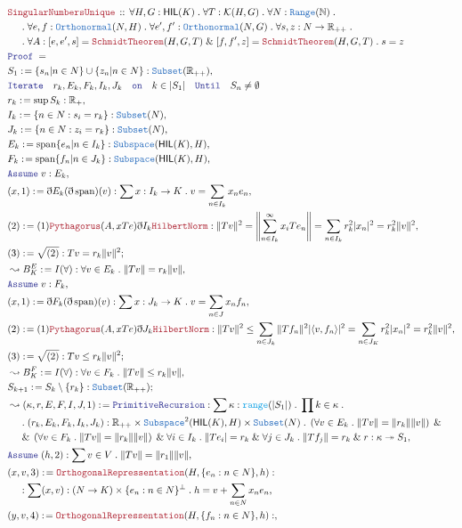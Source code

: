\documentclass[12pt]{scrartcl}
\newcommand{\TYPE}[1]{\textcolor{NavyBlue}{\mathtt{#1}}}
\newcommand{\FUNC}[1]{\textcolor{Cerulean}{\mathtt{#1}}}
\newcommand{\LOGIC}[1]{\textcolor{Blue}{\mathtt{#1}}}
\newcommand{\THM}[1]{\textcolor{Maroon}{\mathtt{#1}}}
\renewcommand{\.}{\; . \;}
\newcommand{\de}{: \kern 0.1pc =}
\newcommand{\Theorem}[2]{& \THM{#1} \, :: \, #2 \\ & \Proof = \\ }
\newcommand{\NewLine}{\\ & \kern 1pc}
\newcommand{\Page}[1]{\begin{align*} #1 \end{align*} \newpage   }
\newcommand{ \bd }{ \ByDef }
\renewcommand{\And}{\; \& \;}
\newcommand{\Reals}{\mathbb{R} }
\newcommand{\Nat}{\mathbb{N} }
\newcommand{\ToSurj}{\twoheadrightarrow}
\newcommand{\Say}[3]{& #1 \de #2 : #3, \\}
\newcommand{\Conclude}[3]{& #1 \de #2 : #3; \\}
\newcommand{\Derive}[3]{& \leadsto #1 \de #2 : #3, \\}
\newcommand{\A}{\LOGIC{Assume} \;}
\newcommand{\Assume}[2]{& \A #1 : #2, \\}
\newcommand{\ByDef}{\eth}
\newcommand{\Proof}{\LOGIC{Proof} \; }
\DeclareMathOperator{\Span}{span}
\newcommand{\HIL}{\mathsf{HIL}} %
\newcommand{\K}{\mathcal{K}} %
\begin{document}
\Page{
	\Theorem{SingularNumbersUnique}{\forall H,G : \HIL(K) \. \forall T : \K(H,G) \. \forall N : \TYPE{Range}(\Nat) \.
    \NewLine \.
    \forall e,f : \TYPE{Orthonormal}(N,H) \. \forall e',f' : \TYPE{Orthonormal}(N,G) \. \forall s,z : N \to \Reals_{++} \.
    \NewLine \.
    \forall A : [e,e',s] = \THM{SchmidtTheorem}(H,G,T)  \And [f,f',z] = \THM{SchmidtTheorem}(H,G,T) \. s = z
  }
  \Say{S_1}{ \{ s_n | n \in N \} \cup \{z_n | n \in N\} }{\TYPE{Subset}(\Reals_{++})}
  & \LOGIC{Iterate} \quad r_k, E_k,F_k,I_k,J_k \quad \LOGIC{on}  \quad k \in |S_1| \quad \LOGIC{Until}\quad S_n \neq \emptyset \\
  \Say{r_k}{\sup S_k}{\Reals_+}
  \Say{I_k}{ \{ n \in N : s_i = r_k  \}}{\TYPE{Subset}(N)}
  \Say{J_k}{\{ n \in N : z_i = r_k \}}{\TYPE{Subset}(N)}
  \Say{E_k}{ \Span \{ e_n | n \in I_k \}}{ \TYPE{Subspace}(\HIL(K),H)}
  \Say{F_k}{\Span \{ f_n | n \in J_k\}}{\TYPE{Subspace}(\HIL(K),H)}
  \Assume{v}{E_k}
  \Say{(x,1)}{\bd E_k(\bd\Span)(v)}{ \sum x : I_k \to K \. v = \sum_{n \in I_k} x_n e_n }
  \Say{(2)}{ (1) \THM{Pythagorus}(A,xTe) \bd I_k \THM{HilbertNorm} }{ \| Tv\|^2 =  \left\| \sum^\infty_{n \in I_k} x_iTe_n \right\| = 
  \sum_{n \in I_k} r^2_k|x_n|^2 = r^2_k \| v \|^2   }
  \Conclude{(3)}{\sqrt{(2)}}{Tv = r_k \|v\|^2}
  \Derive{B^E_K}{I(\forall)}{\forall v \in E_k \. \|Tv\| = r_k \|v\|}
  \Assume{v}{F_k}
  \Say{(x,1)}{\bd F_k(\bd\Span)(v)}{ \sum x : J_k \to K \. v = \sum_{n \in J} x_n f_n }
  \Say{(2)}{ (1) \THM{Pythagorus}(A,xTe) \bd J_k \THM{HilbertNorm} }{ \| Tv\|^2 \le \sum_{n \in J_k} \| Tf_n \|^2|\langle v, f_n \rangle|^2 = 
  \sum_{n \in J_K} r^2_k|x_n|^2 = r^2_k \| v \|^2   }
  \Conclude{(3)}{\sqrt{(2)}}{Tv \le r_k \|v\|^2}
  \Derive{B^F_K}{I(\forall)}{\forall v \in F_k \. \|Tv\| \le r_k \|v\|}
  \Conclude{S_{k+1}}{S_k \setminus \{r_k\}}{\TYPE{Subset}(\Reals_{++})}
  \Derive{(\kappa,r,E,F,I,J,1)}{\LOGIC{PrimitiveRecursion}}{\sum \kappa : \FUNC{range}(|S_1|) \. \prod k \in \kappa \.
  \NewLine \. (r_k,E_k,F_k,I_k,J_k) : \Reals_{++} \times \TYPE{Subspace}^2(\HIL(K),H) \times \TYPE{Subset}(N) \. 
  \left(\forall v \in E_k \. \| T v \| = \| r_k \| \| v \| \right) 
  \And \NewLine \And \left( \forall v \in F_k \. \|Tv \| = \|r_k \| \| v \| \right) 
  \And \forall i \in I_k \. \| Te_i | = r_k \And \forall j \in J_k \. \|Tf_j\| = r_k
  \And r : \kappa \ToSurj S_1
  }
  \Assume{(h,2) }{ \sum v \in V \. \|Tv \| = \|r_1 \| \|v\|}
  \Say{(x,v,3)}{\THM{OrthogonalRepressentation}(H,\{ e_n : n \in N\},h)}{
   \NewLine : \sum (x,v) : (N \to K) \times \{e_n : n \in N\}^\bot \. h =  v +  \sum_{n \in N} x_n e_n }
  \Say{(y,v,4)}{\THM{OrthogonalRepressentation}(H,\{ f_n : n \in N\},h)}{
}}
\end{document}
